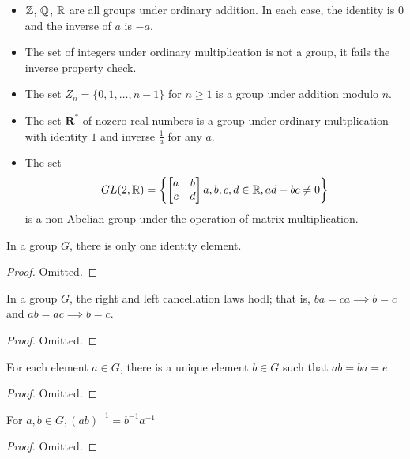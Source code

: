\documentclass[12pt]{scrartcl}
\begin{document}
\begin{example}
  \begin{itemize}
    \item $\mathbb Z$, $\mathbb Q$, $\mathbb R$ are all groups under ordinary addition. In each case, the identity is $0$ and the inverse of $a$ is $-a$. 
    \item The set of integers under ordinary multiplication is not a group, it fails the inverse property check. 
    \item The set $Z_n = \{0, 1, \ldots, n-1\}$ for $n \geq 1$ is a group under addition modulo $n$. 
    \item The set $\textbf{R}^*$ of nozero real numbers is a group under ordinary multplication with identity $1$ and inverse $\frac{1}{a}$ for any $a$. 
    \item The set 
    \[GL(2, \mathbb R) = \left\{ \begin{bmatrix}
    a & b \\ c & d
    \end{bmatrix} a, b, c , d \in \mathbb R, ad - bc \neq 0\right\}\]
    is a non-Abelian group under the operation of matrix multiplication. 
  \end{itemize}
\end{example}

\begin{theorem}
  In a group $G$, there is only one identity element. 
  \begin{proof}
    Omitted.
  \end{proof}
\end{theorem}

\begin{theorem}[Cancellation]
  In a group $G$, the right and left cancellation laws hodl; that is, $ba = ca \implies b =c$ and 
  $ab = ac \implies b = c$. 
  \begin{proof}
    Omitted.
  \end{proof}
\end{theorem}

\begin{theorem}
  For each element $a \in G$, there is a unique element $b \in G$ such that $ab = ba = e$. 
  \begin{proof}
    Omitted.
  \end{proof}
\end{theorem}

\begin{theorem}
  For $a, b \in G, (ab)^{-1} = b^{-1}a^{-1}$
  \begin{proof}
    Omitted.
  \end{proof}
\end{theorem}
\end{document}
